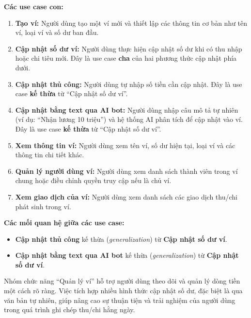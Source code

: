\documentclass[../DoAn.tex]{subfiles}
\begin{document}
\textbf{Các use case con:}
\begin{enumerate}
    \item \textbf{Tạo ví:}  
    Người dùng tạo một ví mới và thiết lập các thông tin cơ bản như tên ví, loại ví và số dư ban đầu.

    \item \textbf{Cập nhật số dư ví:}  
    Người dùng thực hiện cập nhật số dư khi có thu nhập hoặc chi tiêu mới.  
    Đây là use case \textbf{cha} của hai phương thức cập nhật phía dưới.

    \item \textbf{Cập nhật thủ công:}  
    Người dùng tự nhập số tiền cần cập nhật.  
    Đây là use case \textbf{kế thừa} từ “Cập nhật số dư ví”.

    \item \textbf{Cập nhật bằng text qua AI bot:}  
    Người dùng nhập câu mô tả tự nhiên (ví dụ: “Nhận lương 10 triệu”) và hệ thống AI phân tích để cập nhật vào ví.  
    Đây là use case \textbf{kế thừa} từ “Cập nhật số dư ví”.

    \item \textbf{Xem thông tin ví:}  
    Người dùng xem tên ví, số dư hiện tại, loại ví và các thông tin chi tiết khác.

    \item \textbf{Quản lý người dùng ví:}  
    Người dùng xem danh sách thành viên trong ví chung hoặc điều chỉnh quyền truy cập nếu là chủ ví.

    \item \textbf{Xem giao dịch của ví:}  
    Người dùng xem danh sách các giao dịch thu/chi phát sinh trong ví.
\end{enumerate}

\textbf{Các mối quan hệ giữa các use case:}
\begin{itemize}
    \item \textbf{Cập nhật thủ công} kế thừa (\textit{generalization}) từ \textbf{Cập nhật số dư ví}.
    \item \textbf{Cập nhật bằng text qua AI bot} kế thừa (\textit{generalization}) từ \textbf{Cập nhật số dư ví}.
\end{itemize}

Nhóm chức năng ``Quản lý ví'' hỗ trợ người dùng theo dõi và quản lý dòng tiền một cách rõ ràng. 
Việc tích hợp nhiều hình thức cập nhật số dư, đặc biệt là qua văn bản tự nhiên, giúp nâng cao sự thuận tiện và trải nghiệm của người dùng trong quá trình ghi chép thu/chi hằng ngày.
\end{document}
